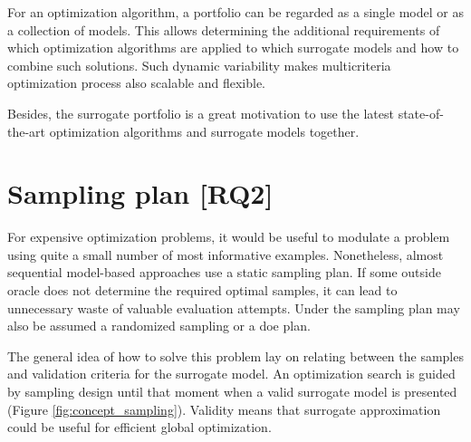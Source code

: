             For an optimization algorithm, a portfolio can be regarded as a single model or as a collection of models. This allows determining the additional requirements of which optimization algorithms are applied to which surrogate models and how to combine such solutions. Such dynamic variability makes multicriteria optimization process also scalable and flexible.
            
            

            Besides, the surrogate portfolio is a great motivation to use the latest state-of-the-art optimization algorithms and surrogate models together.  

    \section{Sampling plan [RQ2]}
        For expensive optimization problems, it would be useful to modulate a problem using quite a small number of most informative examples. Nonetheless, almost sequential model-based approaches use a static sampling plan. If some outside oracle does not determine the required optimal samples, it can lead to unnecessary waste of valuable evaluation attempts. Under the sampling plan may also be assumed a randomized sampling or a \gls{doe} plan.
        
        The general idea of how to solve this problem lay on relating between the samples and validation criteria for the surrogate model. An optimization search is guided by sampling design until that moment when a valid surrogate model is presented (Figure \ref{fig:concept_sampling}). Validity means that surrogate approximation could be useful for efficient global optimization.

